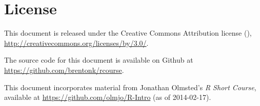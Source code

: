 \maketitle

\chapter*{License}
\thispagestyle{empty}

\noindent%
This document is released under the Creative Commons Attribution license
(\ccby), \url{http://creativecommons.org/licenses/by/3.0/}.

\bigskip%
\noindent%
The source code for this document is available on Github at
\url{https://github.com/brentonk/rcourse}.

\bigskip%
\noindent%
This document incorporates material from Jonathan Olmsted's {\it R Short
Course}, available at \url{https://github.com/olmjo/R-Intro} (as of
2014-02-17).

\tableofcontents

